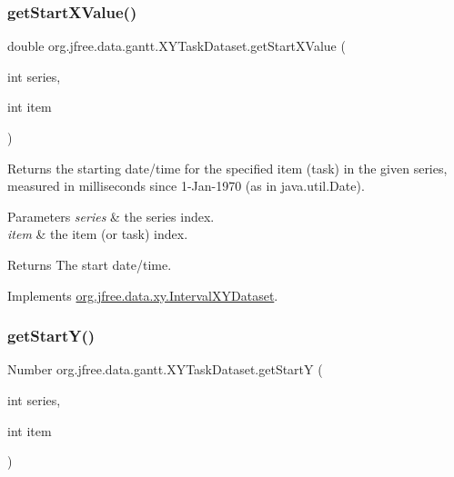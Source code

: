\subsubsection{\texorpdfstring{get\+Start\+X\+Value()}{getStartXValue()}}
{\footnotesize\ttfamily double org.\+jfree.\+data.\+gantt.\+X\+Y\+Task\+Dataset.\+get\+Start\+X\+Value (\begin{DoxyParamCaption}\item[{int}]{series,  }\item[{int}]{item }\end{DoxyParamCaption})}

Returns the starting date/time for the specified item (task) in the given series, measured in milliseconds since 1-\/\+Jan-\/1970 (as in java.\+util.\+Date).


\begin{DoxyParams}{Parameters}
{\em series} & the series index. \\
\hline
{\em item} & the item (or task) index.\\
\hline
\end{DoxyParams}
\begin{DoxyReturn}{Returns}
The start date/time. 
\end{DoxyReturn}


Implements \mbox{\hyperlink{interfaceorg_1_1jfree_1_1data_1_1xy_1_1_interval_x_y_dataset_a437afe7f637a8d16ad305023a7819eef}{org.\+jfree.\+data.\+xy.\+Interval\+X\+Y\+Dataset}}.

\mbox{\label{classorg_1_1jfree_1_1data_1_1gantt_1_1_x_y_task_dataset_ac57b2efa4ecc02718674beae6f1526c0}} 
\subsubsection{\texorpdfstring{get\+Start\+Y()}{getStartY()}}
{\footnotesize\ttfamily Number org.\+jfree.\+data.\+gantt.\+X\+Y\+Task\+Dataset.\+get\+StartY (\begin{DoxyParamCaption}\item[{int}]{series,  }\item[{int}]{item }\end{DoxyParamCaption})}

